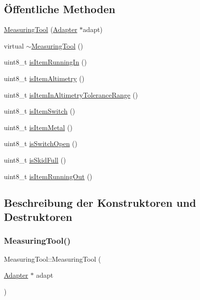 \subsection*{Öffentliche Methoden}
\begin{DoxyCompactItemize}
\item 
\hyperlink{class_measuring_tool_a2528d2728f77b7f2ed61a9f364340bb8}{Measuring\+Tool} (\hyperlink{class_adapter}{Adapter} $\ast$adapt)
\item 
virtual \hyperlink{class_measuring_tool_a35667285cd41bda48fcc747194c862cd}{$\sim$\+Measuring\+Tool} ()
\item 
uint8\+\_\+t \hyperlink{class_measuring_tool_a1749a84c95ae88ef6e8e65edfa2204bc}{is\+Item\+Running\+In} ()
\item 
uint8\+\_\+t \hyperlink{class_measuring_tool_aebbb332d935cadef3c072ca7102896d3}{is\+Item\+Altimetry} ()
\item 
uint8\+\_\+t \hyperlink{class_measuring_tool_a431263df5654d0dc1587ef23e97c1392}{is\+Item\+In\+Altimetry\+Tolerance\+Range} ()
\item 
uint8\+\_\+t \hyperlink{class_measuring_tool_a25d27399efb7e1a0daceeb270e9c26cc}{is\+Item\+Switch} ()
\item 
uint8\+\_\+t \hyperlink{class_measuring_tool_a1d98ab82733fbdee6e63f880a8ace322}{is\+Item\+Metal} ()
\item 
uint8\+\_\+t \hyperlink{class_measuring_tool_ad46b12c36f63fa9b597b1df6468d6aac}{is\+Switch\+Open} ()
\item 
uint8\+\_\+t \hyperlink{class_measuring_tool_a33ece6093e5b77f9353f86d2d9be64f6}{is\+Skid\+Full} ()
\item 
uint8\+\_\+t \hyperlink{class_measuring_tool_a0941de19234c2026359e4cc973f7bb1b}{is\+Item\+Running\+Out} ()
\end{DoxyCompactItemize}


\subsection{Beschreibung der Konstruktoren und Destruktoren}
\hypertarget{class_measuring_tool_a2528d2728f77b7f2ed61a9f364340bb8}{}\label{class_measuring_tool_a2528d2728f77b7f2ed61a9f364340bb8} 
\subsubsection{\texorpdfstring{Measuring\+Tool()}{MeasuringTool()}}
{\footnotesize\ttfamily Measuring\+Tool\+::\+Measuring\+Tool (\begin{DoxyParamCaption}\item[{\hyperlink{class_adapter}{Adapter} $\ast$}]{adapt }\end{DoxyParamCaption})}

